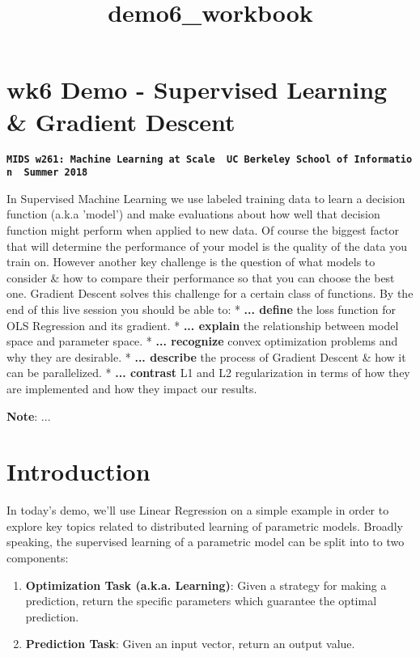 \documentclass[11pt]{article}
\title{demo6\_workbook}
\providecommand{\tightlist}{%
      \setlength{\itemsep}{0pt}\setlength{\parskip}{0pt}}
\begin{document}
    
    
    \maketitle
    
    

    
    \section{wk6 Demo - Supervised Learning \& Gradient
Descent}\label{wk6-demo---supervised-learning-gradient-descent}

\textbf{\texttt{MIDS\ w261:\ Machine\ Learning\ at\ Scale\ \textbar{}\ UC\ Berkeley\ School\ of\ Information\ \textbar{}\ Summer\ 2018}}

In Supervised Machine Learning we use labeled training data to learn a
decision function (a.k.a 'model') and make evaluations about how well
that decision function might perform when applied to new data. Of course
the biggest factor that will determine the performance of your model is
the quality of the data you train on. However another key challenge is
the question of what models to consider \& how to compare their
performance so that you can choose the best one. Gradient Descent solves
this challenge for a certain class of functions. By the end of this live
session you should be able to: * \textbf{... define} the loss function
for OLS Regression and its gradient. * \textbf{... explain} the
relationship between model space and parameter space. * \textbf{...
recognize} convex optimization problems and why they are desirable. *
\textbf{... describe} the process of Gradient Descent \& how it can be
parallelized. * \textbf{... contrast} L1 and L2 regularization in terms
of how they are implemented and how they impact our results.

\textbf{Note}: ...

    \section{Introduction}\label{introduction}

In today's demo, we'll use Linear Regression on a simple example in
order to explore key topics related to distributed learning of
parametric models. Broadly speaking, the supervised learning of a
parametric model can be split into to two components:

\begin{enumerate}
\def\labelenumi{\arabic{enumi}.}
\tightlist
\item
  \textbf{Optimization Task (a.k.a. Learning)}: Given a strategy for
  making a prediction, return the specific parameters which guarantee
  the optimal prediction.\\
\item
  \textbf{Prediction Task}: Given an input vector, return an output
  value.
\end{enumerate}
\end{document}
